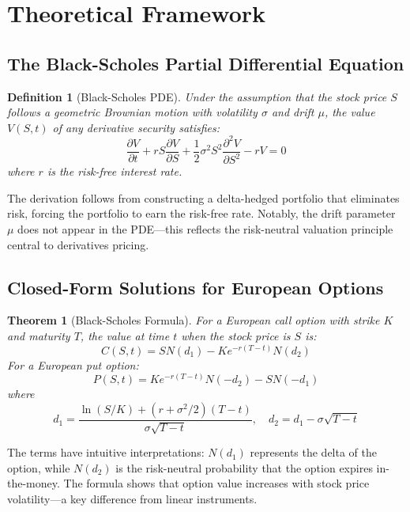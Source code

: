 \documentclass[a4paper, 11pt]{article}
\newtheorem{definition}{Definition}[section]
\newtheorem{theorem}{Theorem}[section]
\begin{document}
\section{Theoretical Framework}

\subsection{The Black-Scholes Partial Differential Equation}

\begin{definition}[Black-Scholes PDE]
Under the assumption that the stock price $S$ follows a geometric Brownian motion with volatility $\sigma$ and drift $\mu$, the value $V(S,t)$ of any derivative security satisfies:
\begin{equation}
\frac{\partial V}{\partial t} + rS\frac{\partial V}{\partial S} + \frac{1}{2}\sigma^2 S^2 \frac{\partial^2 V}{\partial S^2} - rV = 0
\end{equation}
where $r$ is the risk-free interest rate.
\end{definition}

The derivation follows from constructing a delta-hedged portfolio that eliminates risk, forcing the portfolio to earn the risk-free rate. Notably, the drift parameter $\mu$ does not appear in the PDE—this reflects the risk-neutral valuation principle central to derivatives pricing.

\subsection{Closed-Form Solutions for European Options}

\begin{theorem}[Black-Scholes Formula]
For a European call option with strike $K$ and maturity $T$, the value at time $t$ when the stock price is $S$ is:
\begin{equation}
C(S,t) = S N(d_1) - K e^{-r(T-t)} N(d_2)
\end{equation}
For a European put option:
\begin{equation}
P(S,t) = K e^{-r(T-t)} N(-d_2) - S N(-d_1)
\end{equation}
where
\begin{equation}
d_1 = \frac{\ln(S/K) + (r + \sigma^2/2)(T-t)}{\sigma\sqrt{T-t}}, \quad d_2 = d_1 - \sigma\sqrt{T-t}
\end{equation}
\end{theorem}

The terms have intuitive interpretations: $N(d_1)$ represents the delta of the option, while $N(d_2)$ is the risk-neutral probability that the option expires in-the-money. The formula shows that option value increases with stock price volatility—a key difference from linear instruments.
\end{document}
